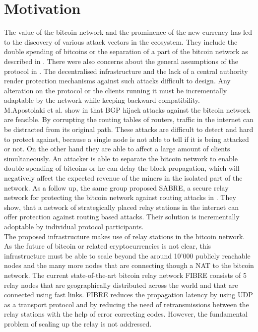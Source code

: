 \section{\label{introduction:motivation}Motivation}
The value of the bitcoin network and the prominence of the new currency has led to the discovery of various attack vectors in the ecosystem. They include the double spending of bitcoins \cite{rosenfeld2014analysis} or the separation of a part of the bitcoin network as described in \cite{heilman2015eclipse}. There were also concerns about the general assumptions of the protocol in \cite{eyal2014majority}. The decentralised infrastructure and the lack of a central authority render protection mechanisms against such attacks difficult to design. Any alteration on the protocol or the clients running it must be incrementally adaptable by the network while keeping backward compatibility. \\
M.Apostolaki et al. show in \cite{apostolaki2017hijacking} that BGP hijack attacks against the bitcoin network are feasible. By corrupting the routing tables of routers, traffic in the internet can be distracted from its original path. These attacks are difficult to detect and hard to protect against, because a single node is not able to tell if it is being attacked or not. On the other hand they are able to affect a large amount of clients simultaneously. An attacker is able to separate the bitcoin network to enable double spending of bitcoins or he can delay the block propagation, which will negatively affect the expected revenue of the miners in the isolated part of the network. As a follow up, the same group proposed SABRE, a secure relay network for protecting the bitcoin network against routing attacks in \cite{apostolaki2018}. They show, that a network of strategically placed relay stations in the internet can offer protection against routing based attacks. Their solution is incrementally adoptable by individual protocol participants.\\
The proposed infrastructure makes use of relay stations in the bitcoin network. As the future of bitcoin or related cryptocurrencies is not clear, this infrastructure must be able to scale beyond the around 10'000 publicly reachable nodes \cite{bitcoinexplorer} and the many more nodes that are connecting though a NAT to the bitcoin network. The current state-of-the-art bitcoin relay network FIBRE \cite{fibre} consists of 5 relay nodes that are geographically distributed across the world and that are connected using fast links. FIBRE reduces the propagation latency by using UDP as a transport protocol and by reducing the need of retransmissions between the relay stations with the help of error correcting codes. However, the fundamental problem of scaling up the relay is not addressed.

